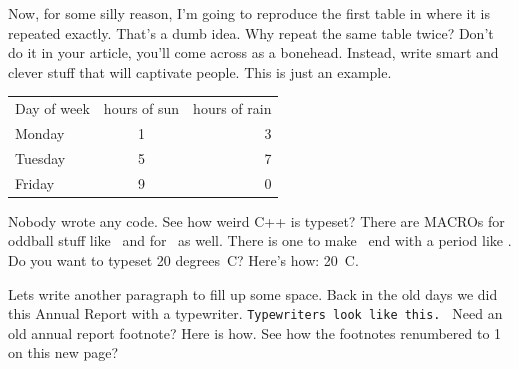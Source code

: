Now, for some silly reason, I'm going to reproduce the first table in  where it is repeated exactly. That's a dumb idea. Why repeat the same table twice? Don't do it in your article, you'll come across as a bonehead. Instead, write smart and clever stuff that will captivate people. This is just an example.

\begin{table}[h]
\begin{center}
\begin{tabular}{lcr}
Day of week &  hours of sun & hours of rain \\
Monday &	1	& 3 \\
Tuesday & 5  & 7 \\
Friday & 9 & 0 \\
\end{tabular}

\label{mytable2} %

\end{center}
\end{table}



Nobody wrote any \cpp code.  See how weird C++ is typeset? There are MACROs for oddball stuff like \MJ\ and for \snop\ as well. There is one to make \MJ\ end with a period like \MJ. Do you want to typeset 20 degrees~C? Here's how: 20\degrees~C.

Lets write another paragraph to fill up some space.  Back in the old days we did this Annual Report with a typewriter.  {\tt Typewriters look like this. } Need an old annual report footnote?  Here is how. See how the footnotes renumbered to 1 on this new page?


